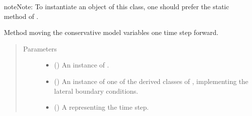 \documentclass[letterpaper,10pt,english]{sphinxmanual}
\begin{document}
\begin{fulllineitems}
\begin{fulllineitems}
\begin{quote}
\begin{description}
\end{description}\end{quote}

\begin{sphinxadmonition}{note}{Note:}
To instantiate an object of this class, one should prefer the static method
{\hyperref[\detokenize{api:dycore.isentropic_prognostic.IsentropicPrognostic.factory}]{}} of
{\hyperref[\detokenize{api:dycore.isentropic_prognostic.IsentropicPrognostic}]{}}.
\end{sphinxadmonition}

\end{fulllineitems}


\begin{fulllineitems}
\label{\detokenize{api:dycore.isentropic_prognostic.OneTimeLevelIsentropicPrognostic.step_forward}}
Method moving the conservative model variables one time step forward.
\begin{quote}\begin{description}
\item[{Parameters}] \leavevmode\begin{itemize}
\item {} 
 () \textendash{} An instance of {\hyperref[\detokenize{api:dycore.isentropic_diagnostic.IsentropicDiagnostic}]{}}.

\item {} 
 () \textendash{} An instance of one of the derived classes of {\hyperref[\detokenize{api:dycore.horizontal_boundary.HorizontalBoundary}]{}},
implementing the lateral boundary conditions.

\item {} 
 () \textendash{} A  representing the time step.


\end{itemize}
\end{description}
\end{quote}
\end{fulllineitems}
\end{fulllineitems}
\end{document}
